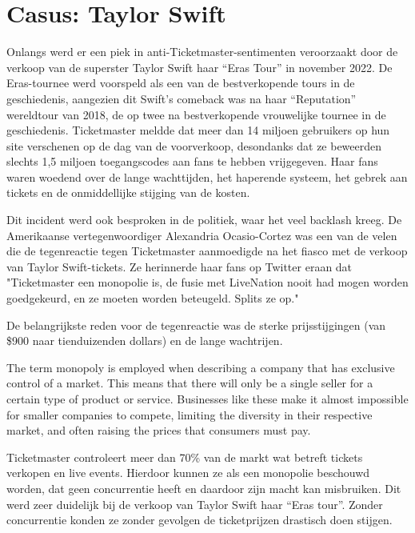 
\section{Casus: Taylor Swift}


Onlangs werd er een piek in anti-Ticketmaster-sentimenten veroorzaakt door de verkoop van de superster Taylor Swift haar “Eras Tour” in november 2022. 
De Eras-tournee werd voorspeld als een van de bestverkopende tours in de geschiedenis, aangezien dit Swift's comeback was na haar “Reputation” wereldtour van 2018, de op twee na bestverkopende vrouwelijke tournee in de geschiedenis.
Ticketmaster meldde dat meer dan 14 miljoen gebruikers op hun site verschenen op de dag van de voorverkoop, desondanks dat ze beweerden slechts 1,5 miljoen toegangscodes aan fans te hebben vrijgegeven. 
Haar fans waren woedend over de lange wachttijden, het haperende systeem, het gebrek aan tickets en de onmiddellijke stijging van de kosten.


Dit incident werd ook besproken in de politiek, waar het veel backlash kreeg.
De Amerikaanse vertegenwoordiger Alexandria Ocasio-Cortez was een van de velen die de tegenreactie tegen Ticketmaster aanmoedigde na het fiasco met de verkoop van Taylor Swift-tickets. Ze herinnerde haar fans op Twitter eraan dat "Ticketmaster een monopolie is, de fusie met LiveNation nooit had mogen worden goedgekeurd, en ze moeten worden beteugeld. Splits ze op."

De belangrijkste reden voor de tegenreactie was de sterke prijsstijgingen (van \$900 naar tienduizenden dollars) en de lange wachtrijen.


The term monopoly is employed when describing a company that has exclusive control of a market.
This means that there will only be a single seller for a certain type of product or service.
Businesses like these make it almost impossible for smaller companies to compete,
limiting the diversity in their respective market, and often raising the prices that consumers must pay.




Ticketmaster controleert meer dan 70\% van de markt wat betreft tickets verkopen en live events.
Hierdoor kunnen ze als een monopolie beschouwd worden, dat geen concurrentie heeft en daardoor zijn macht kan misbruiken. Dit werd zeer duidelijk bij de verkoop van Taylor Swift haar “Eras tour”. Zonder concurrentie konden ze zonder gevolgen de ticketprijzen drastisch doen stijgen. 

